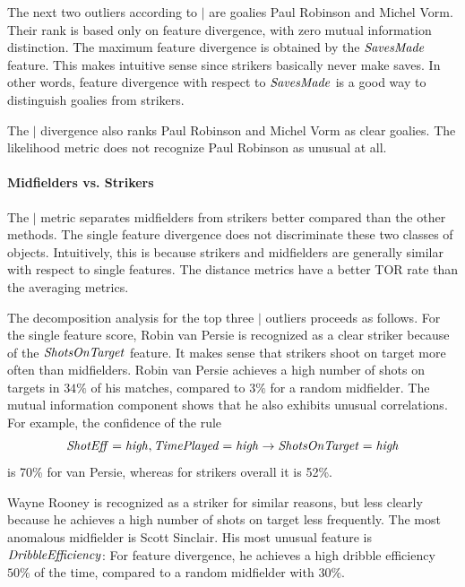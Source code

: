																										The next two outliers according to $\mid$ are goalies Paul Robinson and Michel Vorm. Their rank is based only on feature divergence, with zero mutual information distinction. The maximum feature divergence is obtained by the $\it{SavesMade}$ feature. This makes intuitive sense since strikers basically never make saves. 
																		In other words, feature divergence with respect to $\it{SavesMade}$ is a good way to distinguish goalies from strikers. 
																		
																		The $\mid$ divergence also ranks Paul Robinson and Michel Vorm as clear goalies.  The likelihood metric does not recognize Paul Robinson as unusual at all. 
																		\paragraph{Midfielders vs. Strikers} 
																		The  $\mid$ metric separates midfielders from strikers better compared than the other methods.  
																		The single feature divergence does not discriminate these two classes of objects. Intuitively, this is because strikers and midfielders are generally similar with respect to single features.  
																		The distance metrics have a better TOR rate than the averaging metrics. 
																		
																			The decomposition analysis for the top three $\mid$ outliers proceeds as follows. 
																		For the single feature score, Robin van Persie is recognized as a clear striker because of the $\it{ShotsOnTarget}$ feature. It makes sense that strikers shoot on target more often than midfielders. Robin van Persie  achieves a high number of shots on targets in $34\%$ of his matches, compared to $3\%$ for a random midfielder. The mutual information component shows that he also exhibits  unusual correlations. For example, 
																		the confidence of the rule
																		$$\it{ShotEff} = \it{high}, \it{TimePlayed} = \it{high} \rightarrow \it{ShotsOnTarget} = \it{high}$$
																		is 70\% for van Persie, whereas for strikers overall it is 52\%.
																		
																										Wayne Rooney is recognized as a striker for similar reasons, but less clearly because he achieves a high number of shots on target less frequently. 
																		The most anomalous midfielder is Scott Sinclair. His most unusual feature is $\it{DribbleEfficiency}$: For feature divergence, he achieves a high dribble efficiency $50\%$ of the time, compared to a random midfielder with $30\%$. 
